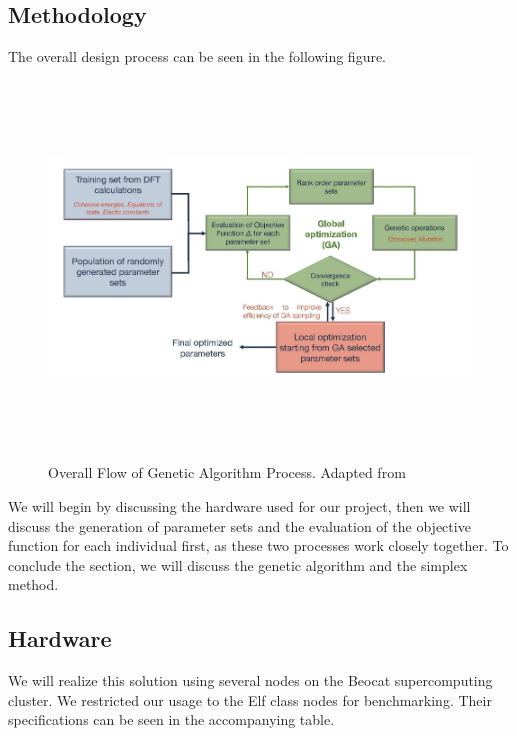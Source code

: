 \documentclass[letterpaper, 12pt]{article}
\begin{document}
\begin{flushleft}
\newpage
\section*{Methodology}
 The overall design process can be seen in the following figure.

 \begin{figure}[H]
 	\includegraphics[width=\linewidth,height=10cm,keepaspectratio]{flowchart.png}
 	\caption[Overall Flow of Genetic Algorithm Process]{Overall Flow of Genetic Algorithm Process. Adapted from \cite{Narayanan}}
 	\label{fig:arch}
 \end{figure}

We will begin by discussing the hardware used for our project, then we will discuss the generation of parameter sets and the evaluation of the objective function for each individual first, as these
two processes work closely together. To conclude the section, we will discuss the genetic algorithm and the simplex method. 

\subsection*{Hardware}

We will realize this solution using several nodes on the Beocat supercomputing cluster.  We restricted our usage to the Elf class nodes for benchmarking. Their specifications can be seen in the accompanying table.
~\newline


\end{flushleft}
\end{document}
